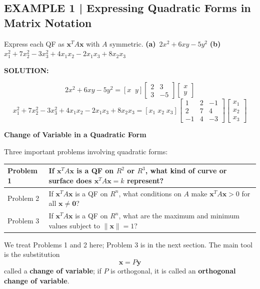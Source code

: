 \documentclass{article}
\newcommand{\redheading}[1]{{\vspace{2mm}\noindent\Large\bfseries\color{red!55!black} #1\par}\vspace{2mm}}
\begin{document}
\subsection*{EXAMPLE 1 | Expressing Quadratic Forms in Matrix Notation}

Express each QF as $\mathbf{x}^T A\mathbf{x}$ with $A$ symmetric.
\textbf{(a)}~$2x^2+6xy-5y^2$ \quad
\textbf{(b)}~$x_1^2+7x_2^2-3x_3^2+4x_1x_2-2x_1x_3+8x_2x_3$

\textbf{SOLUTION:}

\[
  2x^2+6xy-5y^2 = [x\;\;y]\begin{bmatrix}2&3\\3&-5\end{bmatrix}\begin{bmatrix}x\\y\end{bmatrix}
\]
\[
  x_1^2+7x_2^2-3x_3^2+4x_1x_2-2x_1x_3+8x_2x_3
  = [x_1\;x_2\;x_3]\begin{bmatrix}1&2&-1\\2&7&4\\-1&4&-3\end{bmatrix}
  \begin{bmatrix}x_1\\x_2\\x_3\end{bmatrix}
\]

\redheading{Change of Variable in a Quadratic Form}

Three important problems involving quadratic forms:

\begin{center}
\renewcommand{\arraystretch}{1.4}
\begin{tabular}{|l|p{10.5cm}|}
\hline
Problem 1 & If $\mathbf{x}^T A\mathbf{x}$ is a QF on $R^2$ or $R^3$, what kind of curve or
           surface does $\mathbf{x}^T A\mathbf{x}=k$ represent?\\
\hline
Problem 2 & If $\mathbf{x}^T A\mathbf{x}$ is a QF on $R^n$, what conditions on $A$ make
           $\mathbf{x}^T A\mathbf{x}>0$ for all $\mathbf{x}\neq\mathbf{0}$?\\
\hline
Problem 3 & If $\mathbf{x}^T A\mathbf{x}$ is a QF on $R^n$, what are the maximum and minimum
           values subject to $\|\mathbf{x}\|=1$?\\
\hline
\end{tabular}
\end{center}

We treat Problems 1 and 2 here; Problem 3 is in the next section. The main tool is the
substitution
\begin{equation}
  \mathbf{x}=P\mathbf{y} \tag{5}
\end{equation}
called a \textbf{change of variable}; if $P$ is orthogonal, it is called an
\textbf{orthogonal change of variable}.
\end{document}
